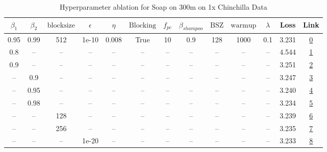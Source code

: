 \begin{table}[H]
\centering
\caption{Hyperparameter ablation for Soap on 300m on 1x Chinchilla Data}
\label{tab:ablation_soap_300m_1}
\begin{tabular}{ccccccccccccc}
\toprule
$\beta_1$ & $\beta_2$ & $\mathrm{block size}$ & $\epsilon$ & $\eta$ & $\mathrm{Blocking}$ & $f_{pc}$ & $\beta_{shampoo}$ & $\mathrm{BSZ}$ & $\mathrm{warmup}$ & $\lambda$ & Loss & Link \\
\midrule
0.95 & 0.99 & 512 & 1e-10 & 0.008 & True & 10 & 0.9 & 128 & 1000 & 0.1 & 3.231 & \href{https://wandb.ai/stanford-mercury/optimizer-scaling/runs/sweep-300m-6B-soape63ad3blr0.008-wd0.1-minlr0-warmup1000-b10.95--02f063}{0} \\
\midrule
0.8 & -- & -- & -- & -- & -- & -- & -- & -- & -- & -- & 4.544 & \href{https://wandb.ai/stanford-mercury/optimizer-scaling/runs/sweep-300m-6B-soapec0ea31lr0.008-wd0.1-minlr0-warmup1000-b10.8-b-319d07}{1} \\
0.9 & -- & -- & -- & -- & -- & -- & -- & -- & -- & -- & 3.251 & \href{https://wandb.ai/stanford-mercury/optimizer-scaling/runs/sweep-300m-6B-soapee624e9lr0.008-wd0.1-minlr0-warmup1000-b10.9-b-ecd8c9}{2} \\
-- & 0.9 & -- & -- & -- & -- & -- & -- & -- & -- & -- & 3.247 & \href{https://wandb.ai/stanford-mercury/optimizer-scaling/runs/sweep-300m-6B-soapeb0ca30lr0.008-wd0.1-minlr0-warmup1000-b10.95--6cae1d}{3} \\
-- & 0.95 & -- & -- & -- & -- & -- & -- & -- & -- & -- & 3.240 & \href{https://wandb.ai/stanford-mercury/optimizer-scaling/runs/sweep-300m-6B-soape92b928lr0.008-wd0.1-minlr0-warmup1000-b10.95--140435}{4} \\
-- & 0.98 & -- & -- & -- & -- & -- & -- & -- & -- & -- & 3.234 & \href{https://wandb.ai/stanford-mercury/optimizer-scaling/runs/sweep-300m-6B-soape74fad0lr0.008-wd0.1-minlr0-warmup1000-b10.95--438330}{5} \\
-- & -- & 128 & -- & -- & -- & -- & -- & -- & -- & -- & 3.239 & \href{https://wandb.ai/stanford-mercury/optimizer-scaling/runs/sweep-300m-6B-soapef30d89lr0.008-wd0.1-minlr0-warmup1000-b10.95--88ca79}{6} \\
-- & -- & 256 & -- & -- & -- & -- & -- & -- & -- & -- & 3.235 & \href{https://wandb.ai/stanford-mercury/optimizer-scaling/runs/sweep-300m-6B-soape1270celr0.008-wd0.1-minlr0-warmup1000-b10.95--5fd15c}{7} \\
-- & -- & -- & 1e-20 & -- & -- & -- & -- & -- & -- & -- & 3.233 & \href{https://wandb.ai/stanford-mercury/optimizer-scaling/runs/sweep-300m-6B-soape17abf2lr0.008-wd0.1-minlr0-warmup1000-b10.95--7c7bf8}{8} \\

\end{tabular}
\end{table}
